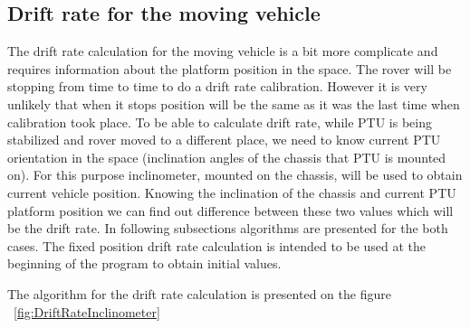 \subsection{Drift rate for the moving vehicle}
The drift rate calculation for the moving vehicle is a bit more complicate and requires information about the platform position in the space. The rover will be stopping from time to time to do a drift rate calibration. However it is very unlikely that when it stops position will be the same as it was the last time when calibration took place. To be able to calculate drift rate, while PTU is being stabilized and rover moved to a different place, we need to know current PTU orientation in the space (inclination angles of the chassis that PTU is mounted on). For this purpose inclinometer, mounted on the chassis, will be used to obtain current vehicle position. Knowing the inclination of the chassis and current PTU platform position we can find out difference between these two values which will be the drift rate. In following subsections algorithms are presented for the both cases. The fixed position drift rate calculation is intended to be used at the beginning of the program to obtain initial values. 

The algorithm for the drift rate calculation is presented on the figure ~\ref{fig:DriftRateInclinometer}

